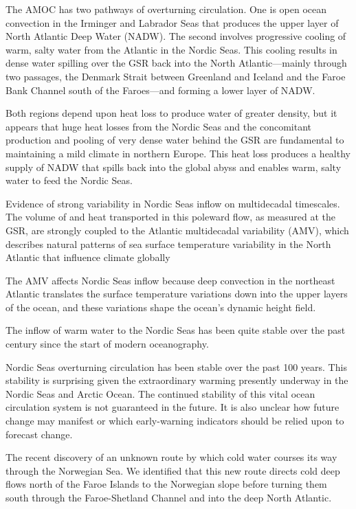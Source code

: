 \documentclass[
]{book}
\begin{document}
The AMOC has two pathways of overturning circulation. One is open ocean convection in the Irminger and Labrador Seas that produces the upper layer of North Atlantic Deep Water (NADW).
The second involves progressive cooling of warm, salty water from the Atlantic in the Nordic Seas. This cooling results in dense water spilling over the GSR back into the North Atlantic---mainly through two passages, the Denmark Strait between Greenland and Iceland and the Faroe Bank Channel south of the Faroes---and forming a lower layer of NADW.

Both regions depend upon heat loss to produce water of greater density, but it appears that huge heat losses from the Nordic Seas and the concomitant production and pooling of very dense water behind the GSR are fundamental to maintaining a mild climate in northern Europe. This heat loss produces a healthy supply of NADW that spills back into the global abyss and enables warm, salty water to feed the Nordic Seas.

Evidence of strong variability in Nordic Seas inflow on multidecadal timescales.
The volume of and heat transported in this poleward flow, as measured at the GSR, are strongly coupled to the Atlantic multidecadal variability (AMV), which describes natural patterns of sea surface temperature variability in the North Atlantic that influence climate globally

The AMV affects Nordic Seas inflow because deep convection in the northeast Atlantic translates the surface temperature variations down into the upper layers of the ocean, and these variations shape the ocean's dynamic height field.

The inflow of warm water to the Nordic Seas has been quite stable over the past century since the start of modern oceanography.

Nordic Seas overturning circulation has been stable over the past 100 years. This stability is surprising given the extraordinary warming presently underway in the Nordic Seas and Arctic Ocean.
The continued stability of this vital ocean circulation system is not guaranteed in the future. It is also unclear how future change may manifest or which early-warning indicators should be relied upon to forecast change.

The recent discovery of an unknown route by which cold water courses its way through the Norwegian Sea. We identified that this new route directs cold deep flows north of the Faroe Islands to the Norwegian slope before turning them south through the Faroe-Shetland Channel and into the deep North Atlantic.
\end{document}
